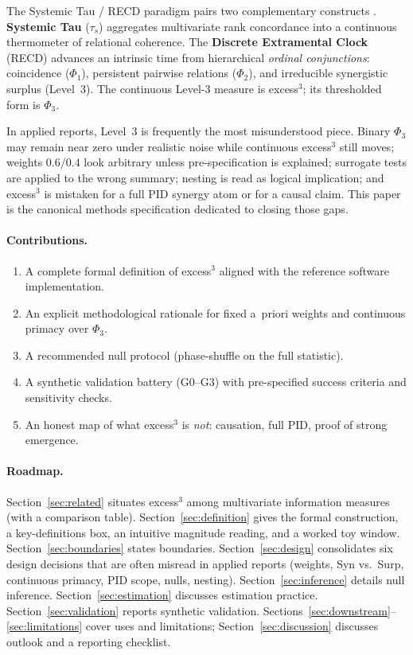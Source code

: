 \documentclass[11pt,a4paper]{article}
\begin{document}
The Systemic Tau / RECD paradigm pairs two complementary constructs
\citep{Padilla2026framework,Padilla2025preprints}. \textbf{Systemic Tau}
($\tau_s$) aggregates multivariate rank concordance into a continuous
thermometer of relational coherence. The \textbf{Discrete Extramental Clock}
(RECD) advances an intrinsic time from hierarchical \emph{ordinal
conjunctions}: coincidence ($\Phi_1$), persistent pairwise relations
($\Phi_2$), and irreducible synergistic surplus (Level~3). The continuous
Level-3 measure is excess$^3$; its thresholded form is $\Phi_3$.

In applied reports, Level~3 is frequently the most misunderstood piece.
Binary $\Phi_3$ may remain near zero under realistic noise while continuous
excess$^3$ still moves; weights $0.6/0.4$ look arbitrary unless
pre-specification is explained; surrogate tests are applied to the wrong
summary; nesting is read as logical implication; and excess$^3$ is mistaken
for a full PID synergy atom or for a causal claim. This paper is the
canonical methods specification dedicated to closing those gaps.

\paragraph{Contributions.}
\begin{enumerate}[leftmargin=*,itemsep=2pt]
  \item A complete formal definition of excess$^3$ aligned with the
  reference software implementation.
  \item An explicit methodological rationale for fixed a~priori weights and
  continuous primacy over $\Phi_3$.
  \item A recommended null protocol (phase-shuffle on the full statistic).
  \item A synthetic validation battery (G0--G3) with pre-specified success
  criteria and sensitivity checks.
  \item An honest map of what excess$^3$ is \emph{not}: causation, full PID,
  proof of strong emergence.
\end{enumerate}

\paragraph{Roadmap.}
Section~\ref{sec:related} situates excess$^3$ among multivariate information
measures (with a comparison table). Section~\ref{sec:definition} gives the
formal construction, a key-definitions box, an intuitive magnitude reading,
and a worked toy window. Section~\ref{sec:boundaries} states boundaries.
Section~\ref{sec:design} consolidates six design decisions that are often
misread in applied reports (weights, Syn vs.\ Surp, continuous primacy,
PID scope, nulls, nesting). Section~\ref{sec:inference} details null
inference. Section~\ref{sec:estimation} discusses estimation practice.
Section~\ref{sec:validation} reports synthetic validation.
Sections~\ref{sec:downstream}--\ref{sec:limitations} cover uses and
limitations; Section~\ref{sec:discussion} discusses outlook and a reporting
checklist.
\end{document}
